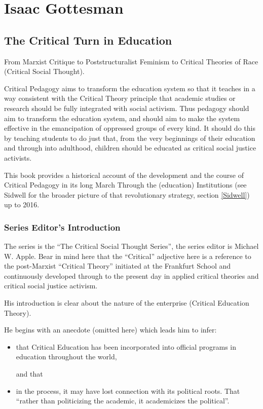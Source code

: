 \documentclass[10pt,titlepage]{book}
\begin{document}
\section{Isaac Gottesman}\label{Gottesman}

\subsection{The Critical Turn in Education \cite{gottesman-criturn}}

From Marxist Critique to Poststructuralist Feminism to Critical Theories of Race (Critical Social Thought).

Critical Pedagogy aims to transform the education system so that it teaches in a way consistent with the Critical Theory principle that academic studies or research should be fully integrated with social activism.
Thus pedagogy should aim to transform the education system, and should aim to make the system effective in the emancipation of oppressed groups of every kind.
It should do this by teaching students to do just that, from the very beginnings of their education and through into adulthood, children should be educated as critical social justice activists.

This book provides a historical account of the development and the course of Critical Pedagogy in its long March Through the (education) Institutions (see Sidwell for the broader picture of that revolutionary strategy, section \ref{Sidwell}) up to 2016.

\subsubsection{Series Editor's Introduction}

The series is the ``The Critical Social Thought Series'', the series editor is Michael W. Apple.
Bear in mind here that the ``Critical'' adjective here is a reference to the post-Marxist ``Critical Theory'' initiated at the Frankfurt School and continuously developed through to the present day in applied critical theories and critical social justice activism.

His introduction is clear about the nature of the enterprise (Critical Education Theory).

He begins with an anecdote (omitted here) which leads him to infer:

\begin{itemize}
\item that Critical Education has been incorporated into official programs in education throughout the world,

  and that
  
\item in the process, it may have lost connection with its political roots. That ``rather than politicizing the academic, it academicizes the political''.
\end{itemize}
\end{document}
